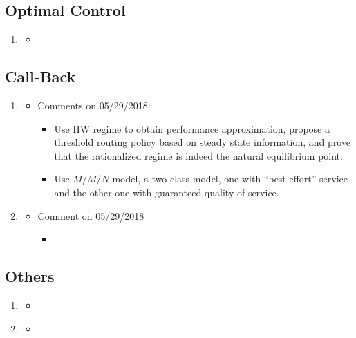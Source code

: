 
\subsection{Optimal Control}
\begin{enumerate}
\item \citet{cudina2006asymptotically}
\begin{itemize}
    \item 
\end{itemize}


\end{enumerate}

\subsection{Call-Back}
\begin{enumerate}
    \item \citet{Armony2004OnDesign}
    \begin{itemize}
        \item Comments on 05/29/2018:
            \begin{itemize}
                \item Use HW regime to obtain performance approximation, propose a threshold routing policy based on steady state information, and prove that the rationalized regime is indeed the natural equilibrium point.
                \item Use $M/M/N$ model, a two-class model, one with ``best-effort'' service and the other one with guaranteed quality-of-service. 
            \end{itemize}
    \end{itemize}
    
    \item \citet{Armony2004ContactInformation}
    \begin{itemize}
        \item Comment on 05/29/2018
        \begin{itemize}
            \item 
        \end{itemize}
    \end{itemize}
\end{enumerate}

\subsection{Others}
\begin{enumerate}
\item \citet{Gans2015ParametricScheduling} 
\begin{itemize}
    \item 
\end{itemize}

\item \citet{Avramidis2004ModelingCenter}
\begin{itemize}
\item 
\end{itemize}

\end{enumerate}
